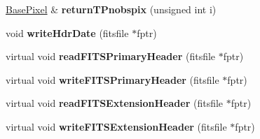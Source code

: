 \begin{DoxyCompactItemize}
\item 
\hypertarget{classSkymap_a612e851fca00454607e45395dfe64dfb}{
\hyperlink{classBasePixel}{BasePixel} \& {\bfseries returnTPnobspix} (unsigned int i)}
\label{classSkymap_a612e851fca00454607e45395dfe64dfb}

\item 
\hypertarget{classSkymap_a92bab429245859365bbebe26d41fbfbd}{
void {\bfseries writeHdrDate} (fitsfile $\ast$fptr)}
\label{classSkymap_a92bab429245859365bbebe26d41fbfbd}

\item 
\hypertarget{classSkymap_ae09507aea73a692ac2ae7e0c2953c11d}{
virtual void {\bfseries readFITSPrimaryHeader} (fitsfile $\ast$fptr)}
\label{classSkymap_ae09507aea73a692ac2ae7e0c2953c11d}

\item 
\hypertarget{classSkymap_a82c3a7bac1619379e295c641fb4e30f2}{
virtual void {\bfseries writeFITSPrimaryHeader} (fitsfile $\ast$fptr)}
\label{classSkymap_a82c3a7bac1619379e295c641fb4e30f2}

\item 
\hypertarget{classSkymap_a7f8d6b1d7e17dbf892f97a552eac75fb}{
virtual void {\bfseries readFITSExtensionHeader} (fitsfile $\ast$fptr)}
\label{classSkymap_a7f8d6b1d7e17dbf892f97a552eac75fb}

\item 
\hypertarget{classSkymap_ac65257c88656db95b7d811fc37bd50fd}{
virtual void {\bfseries writeFITSExtensionHeader} (fitsfile $\ast$fptr)}
\label{classSkymap_ac65257c88656db95b7d811fc37bd50fd}

\end{DoxyCompactItemize}
